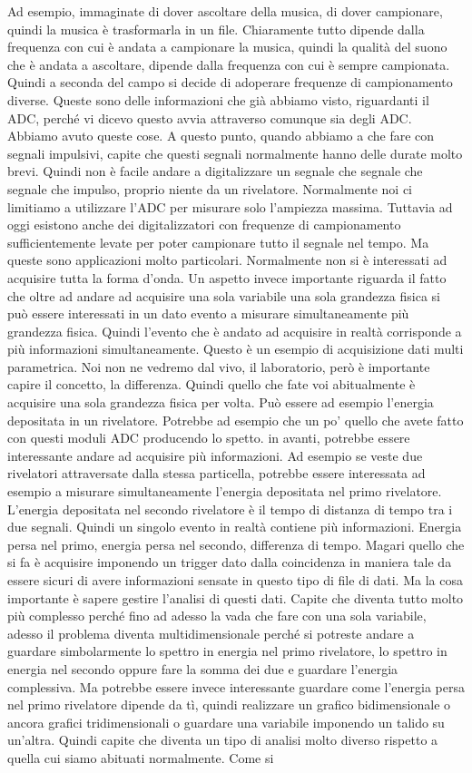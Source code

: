 Ad esempio, immaginate di dover ascoltare della musica, di dover campionare, quindi la musica è trasformarla in un file. Chiaramente tutto dipende dalla frequenza con cui è andata a campionare la musica, quindi la qualità del suono che è andata a ascoltare, dipende dalla frequenza con cui è sempre campionata. Quindi a seconda del campo si decide di adoperare frequenze di campionamento diverse. Queste sono delle informazioni che già abbiamo visto, riguardanti il ADC, perché vi dicevo questo avvia attraverso comunque sia degli ADC. Abbiamo avuto queste cose. A questo punto, quando abbiamo a che fare con segnali impulsivi, capite che questi segnali normalmente hanno delle durate molto brevi. Quindi non è facile andare a digitalizzare un segnale che segnale che segnale che impulso, proprio niente da un rivelatore. Normalmente noi ci limitiamo a utilizzare l'ADC per misurare solo l'ampiezza massima. Tuttavia ad oggi esistono anche dei digitalizzatori con frequenze di campionamento sufficientemente levate per poter campionare tutto il segnale nel tempo. Ma queste sono applicazioni molto particolari. Normalmente non si è interessati ad acquisire tutta la forma d'onda. Un aspetto invece importante riguarda il fatto che oltre ad andare ad acquisire una sola variabile una sola grandezza fisica si può essere interessati in un dato evento a misurare simultaneamente più grandezza fisica. Quindi l'evento che è andato ad acquisire in realtà corrisponde a più informazioni simultaneamente. Questo è un esempio di acquisizione dati multi parametrica. Noi non ne vedremo dal vivo, il laboratorio, però è importante capire il concetto, la differenza. Quindi quello che fate voi abitualmente è acquisire una sola grandezza fisica per volta. Può essere ad esempio l'energia depositata in un rivelatore. Potrebbe ad esempio che un po' quello che avete fatto con questi moduli ADC producendo lo spetto. in avanti, potrebbe essere interessante andare ad acquisire più informazioni. Ad esempio se veste due rivelatori attraversate dalla stessa particella, potrebbe essere interessata ad esempio a misurare simultaneamente l'energia depositata nel primo rivelatore. L'energia depositata nel secondo rivelatore è il tempo di distanza di tempo tra i due segnali. Quindi un singolo evento in realtà contiene più informazioni. Energia persa nel primo, energia persa nel secondo, differenza di tempo. Magari quello che si fa è acquisire imponendo un trigger dato dalla coincidenza in maniera tale da essere sicuri di avere informazioni sensate in questo tipo di file di dati. Ma la cosa importante è sapere gestire l'analisi di questi dati. Capite che diventa tutto molto più complesso perché fino ad adesso la vada che fare con una sola variabile, adesso il problema diventa multidimensionale perché si potreste andare a guardare simbolarmente lo spettro in energia nel primo rivelatore, lo spettro in energia nel secondo oppure fare la somma dei due e guardare l'energia complessiva. Ma potrebbe essere invece interessante guardare come l'energia persa nel primo rivelatore dipende da tì, quindi realizzare un grafico bidimensionale o ancora grafici tridimensionali o guardare una variabile imponendo un talido su un'altra. Quindi capite che diventa un tipo di analisi molto diverso rispetto a quella cui siamo abituati normalmente. Come si 